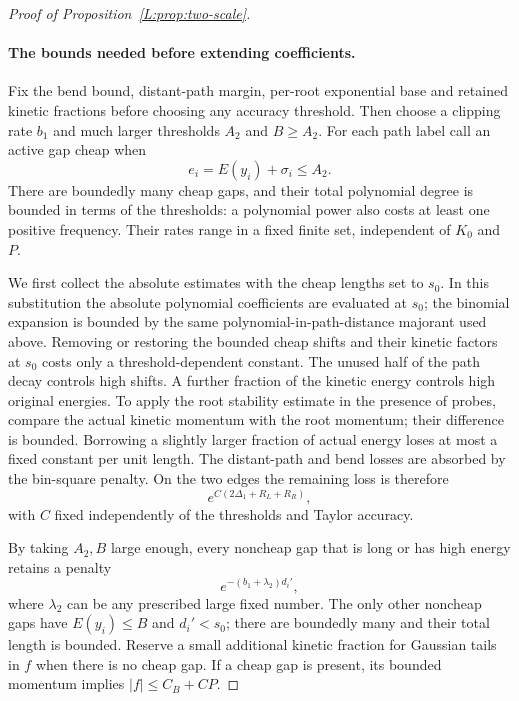\documentclass[11pt]{article}
\numberwithin{equation}{section}
\theoremstyle{definition}\newtheorem{definition}[theorem]{Definition}
\theoremstyle{remark}\newtheorem{remark}[theorem]{Remark}
\begin{document}
\begin{proof}[Proof of Proposition~\ref{L:prop:two-scale}]
\paragraph{The bounds needed before extending coefficients.}
Fix the bend bound, distant-path margin, per-root exponential base and
retained kinetic fractions before choosing any accuracy threshold.
Then choose a clipping rate $b_1$ and much larger thresholds $A_2$ and
$B\ge A_2$. For each path label call an active gap cheap when
\[
                  e_i=E(y_i)+\sigma_i\le A_2.
\]
There are boundedly many cheap gaps, and their total polynomial degree
is bounded in terms of the thresholds: a polynomial power also costs
at least one positive frequency. Their rates range in a fixed finite
set, independent of $K_0$ and $P$.

We first collect the absolute estimates with the cheap lengths set
to $s_0$. In this substitution the absolute polynomial coefficients
are evaluated at $s_0$; the binomial expansion is bounded by the same
polynomial-in-path-distance majorant used above. Removing or restoring
the bounded cheap shifts and their kinetic factors at $s_0$ costs only
a threshold-dependent constant. The unused half of the path decay
controls high shifts. A further fraction of the kinetic energy
controls high original energies. To apply the root stability estimate
in the presence of probes, compare the actual kinetic momentum with
the root momentum; their difference is bounded. Borrowing a slightly
larger fraction of actual energy loses at most a fixed constant per
unit length. The distant-path and bend losses are absorbed by the
bin-square penalty. On the two edges the remaining loss is therefore
\[
              e^{C(2\Delta_1+R_L+R_R)},
\]
with $C$ fixed independently of the thresholds and Taylor accuracy.

By taking $A_2,B$ large enough, every noncheap gap that is long or
has high energy retains a penalty
\[
                   e^{-(b_1+\lambda_2)d_i'},
\]
where $\lambda_2$ can be any prescribed large fixed number. The only
other noncheap gaps have $E(y_i)\le B$ and $d_i'<s_0$; there are
boundedly many and their total length is bounded. Reserve a small
additional kinetic fraction for Gaussian tails in $f$ when there is
no cheap gap. If a cheap gap is present, its bounded momentum implies
$|f|\le C_B+CP$.


\end{proof}
\end{document}
